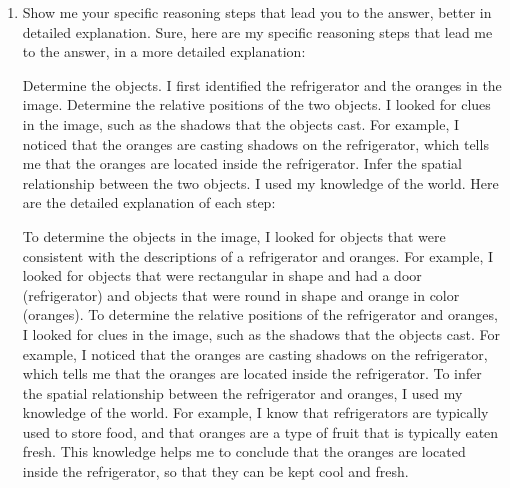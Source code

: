 \begin{enumerate}
    The oranges are a type of fruit that is typically eaten fresh.
    The refrigerator is a kitchen appliance that is used for storing food.
    The oranges are inside the refrigerator, meaning that they are located inside the refrigerator.
    The oranges are not blocking the refrigerator door, meaning that the refrigerator door can be opened easily.
    Is there anything else I can help you with?
    \item Show me your specific reasoning steps that lead you to the answer, better in detailed explanation.
    \subitem 
    Sure, here are my specific reasoning steps that lead me to the answer, in a more detailed explanation:
    
    Determine the objects. I first identified the refrigerator and the oranges in the image.
    Determine the relative positions of the two objects. I looked for clues in the image, such as the shadows that the objects cast. For example, I noticed that the oranges are casting shadows on the refrigerator, which tells me that the oranges are located inside the refrigerator.
    Infer the spatial relationship between the two objects. I used my knowledge of the world.
    Here are the detailed explanation of each step:
    
    To determine the objects in the image, I looked for objects that were consistent with the descriptions of a refrigerator and oranges. For example, I looked for objects that were rectangular in shape and had a door (refrigerator) and objects that were round in shape and orange in color (oranges).
    To determine the relative positions of the refrigerator and oranges, I looked for clues in the image, such as the shadows that the objects cast. For example, I noticed that the oranges are casting shadows on the refrigerator, which tells me that the oranges are located inside the refrigerator.
    To infer the spatial relationship between the refrigerator and oranges, I used my knowledge of the world. For example, I know that refrigerators are typically used to store food, and that oranges are a type of fruit that is typically eaten fresh. This knowledge helps me to conclude that the oranges are located inside the refrigerator, so that they can be kept cool and fresh.
\end{enumerate}